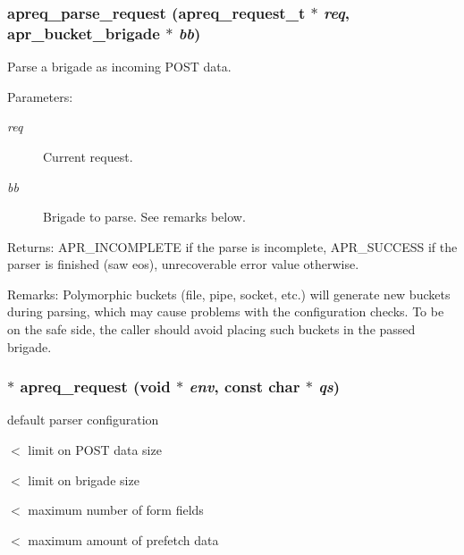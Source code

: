 \subsubsection{ apreq\_\-parse\_\-request ({\bf apreq\_\-request\_\-t} $\ast$ {\em req}, {\bf apr\_\-bucket\_\-brigade} $\ast$ {\em bb})}\label{group__params_a9}


Parse a brigade as incoming POST data. \begin{Desc}
\item[Parameters:]
\begin{description}
\item[{\em req}]Current request. \item[{\em bb}]Brigade to parse. See remarks below. \end{description}
\end{Desc}
\begin{Desc}
\item[Returns:]APR\_\-INCOMPLETE if the parse is incomplete, APR\_\-SUCCESS if the parser is finished (saw eos), unrecoverable error value otherwise.\end{Desc}
\begin{Desc}
\item[Remarks:]Polymorphic buckets (file, pipe, socket, etc.) will generate new buckets during parsing, which may cause problems with the configuration checks. To be on the safe side, the caller should avoid placing such buckets in the passed brigade. \end{Desc}
\subsubsection{$\ast$ apreq\_\-request (void $\ast$ {\em env}, const char $\ast$ {\em qs})}\label{group__params_a3}


default parser configuration

$<$ limit on POST data size

$<$ limit on brigade size

$<$ maximum number of form fields

$<$ maximum amount of prefetch data 
